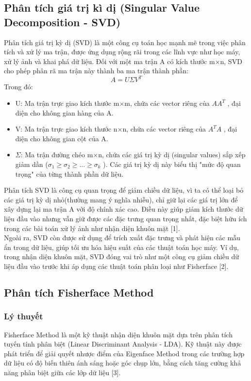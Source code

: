 \documentclass[a4paper,12pt]{extarticle}
\begin{document}
\subsection{Phân tích giá trị kì dị (Singular Value Decomposition - SVD)}
Phân tích giá trị kỳ dị (SVD) là một công cụ toán học mạnh mẽ trong việc phân tích và xử lý ma trận, được ứng dụng rộng rãi trong các lĩnh vực như học máy, xử lý ảnh và khai phá dữ liệu. Đối với một ma trận A có kích thước m×n, SVD cho phép phân rã ma trận này thành ba ma trận thành phần:
\[
A = U \Sigma V^T
\]
Trong đó:
\begin{itemize}
    \item U: Ma trận trực giao kích thước m×m, chứa các vector riêng của $AA^T$ , đại diện cho không gian hàng của A.
    \item V: Ma trận trực giao kích thước n×n, chứa các vector riêng của $A^TA$ , đại diện cho không gian cột của A.
    \item $\Sigma$: Ma trận đường chéo m×n, chứa các giá trị kỳ dị (singular values) sắp xếp giảm dần ($\sigma _1  \geq \sigma _ 2 \geq ... \geq \sigma _k$ ). Các giá trị kỳ dị này biểu thị "mức độ quan trọng" của từng thành phần dữ liệu.   
\end{itemize}
Phân tích SVD là công cụ quan trọng để giảm chiều dữ liệu, vì ta có thể loại bỏ các giá trị kỳ dị nhỏ(thường mang ý nghĩa nhiễu), chỉ giữ lại các giá trị lớn để xây dựng lại ma trận A với độ chính xác cao. Điều này giúp giảm kích thước dữ liệu đầu vào nhưng vẫn giữ được các đặc trưng quan trọng nhất, đặc biệt hữu ích trong các bài toán xử lý ảnh như nhận diện khuôn mặt [1]. \\
Ngoài ra, SVD còn được sử dụng để trích xuất đặc trưng và phát hiện các mẫu ẩn trong dữ liệu, giúp tối ưu hóa hiệu suất của các thuật toán học máy. Ví dụ, trong nhận diện khuôn mặt, SVD đóng vai trò như một công cụ giảm chiều dữ liệu đầu vào trước khi áp dụng các thuật toán phân loại như Fisherface [2].

\subsection{Phân tích Fisherface Method}
\subsubsection{Lý thuyết}
Fisherface Method là một kỹ thuật nhận diện khuôn mặt dựa trên phân tích tuyến tính phân biệt (Linear Discriminant Analysis - LDA). Kỹ thuật này được phát triển để giải quyết nhược điểm của Eigenface Method trong các trường hợp dữ liệu có độ biến thiên ánh sáng hoặc góc chụp lớn, bằng cách tăng cường khả năng phân biệt giữa các lớp dữ liệu [3].
\end{document}
